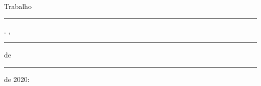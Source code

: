 
\begin{folhadeaprovacao}
\begin{center}
	{\ABNTEXchapterfont\large\imprimirautor}
	\vspace*{\fill}\vspace*{\fill}
	\begin{center}
		\ABNTEXchapterfont\bfseries\Large\imprimirtitulo
	\end{center}
	\vspace*{\fill}
	\hspace{.45\textwidth}
	\begin{minipage}{.5\textwidth}
		\imprimirpreambulo
	\end{minipage}%
	\vspace*{\fill}
\end{center}

Trabalho \rule{4cm}{1pt}. \imprimirlocal, \rule{1cm}{1pt} de \rule{3cm}{1pt} de 2020:

\begin{center}
	\vspace*{0.5cm}
	{\large\imprimirlocal}
	\par
	{\large\imprimirdata}
	\vspace*{1cm}
\end{center}
\end{folhadeaprovacao}